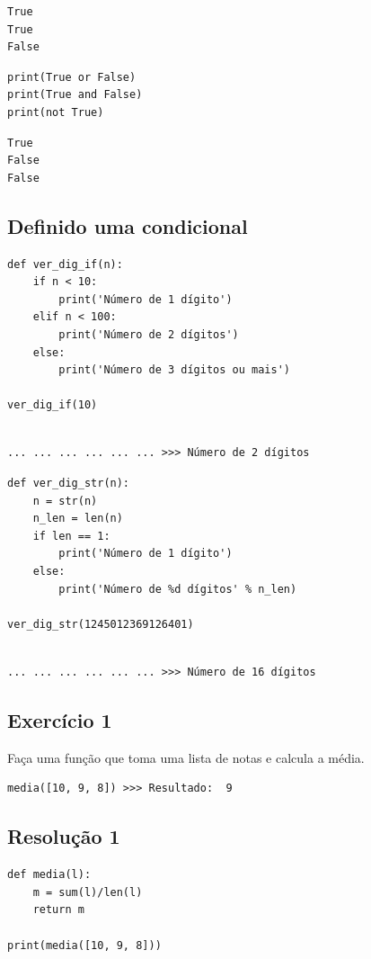 \documentclass[presentation]{beamer}
\begin{document}
\begin{verbatim}
True
True
False
\end{verbatim}

\begin{verbatim}
print(True or False)
print(True and False)
print(not True)
\end{verbatim}

\begin{verbatim}
True
False
False
\end{verbatim}
\subsection{Definido uma condicional}
\label{sec:orgheadline73}
\begin{verbatim}
def ver_dig_if(n):
    if n < 10:
        print('Número de 1 dígito')
    elif n < 100:
        print('Número de 2 dígitos')
    else:
        print('Número de 3 dígitos ou mais')

ver_dig_if(10)
\end{verbatim}

\begin{verbatim}

... ... ... ... ... ... >>> Número de 2 dígitos
\end{verbatim}

\begin{verbatim}
def ver_dig_str(n):
    n = str(n)
    n_len = len(n)
    if len == 1:
        print('Número de 1 dígito')
    else: 
        print('Número de %d dígitos' % n_len)

ver_dig_str(1245012369126401)
\end{verbatim}

\begin{verbatim}

... ... ... ... ... ... >>> Número de 16 dígitos
\end{verbatim}
\subsection{Exercício 1}
\label{sec:orgheadline74}
Faça uma função que toma uma lista de notas e calcula a média.

\begin{verbatim}
media([10, 9, 8]) >>> Resultado:  9
\end{verbatim}
\subsection{Resolução 1}
\label{sec:orgheadline75}
\begin{verbatim}
def media(l):
    m = sum(l)/len(l)
    return m

print(media([10, 9, 8]))
\end{verbatim}
\end{document}
